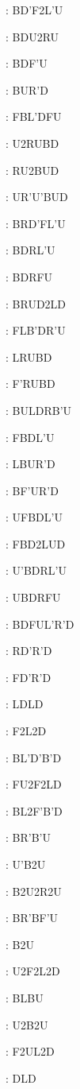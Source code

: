 \documentclass[9pt]{article}
\begin{document}
{\begin{multicols}{6}
: BD'F2L'U

: BDU2RU

: BDF'U

: BUR'D

: FBL'DFU

: U2RUBD

: RU2BUD

: UR'U'BUD

: BRD'FL'U

: BDRL'U

: BDRFU

: BRUD2LD

: FLB'DR'U

: LRUBD

: F'RUBD

: BULDRB'U

: FBDL'U

: LBUR'D

: BF'UR'D

: UFBDL'U

: FBD2LUD

: U'BDRL'U

: UBDRFU

: BDFUL'R'D

: RD'R'D

: FD'R'D

: LDLD

: F2L2D

: BL'D'B'D

: FU2F2LD

: BL2F'B'D

: BR'B'U

: U'B2U

: B2U2R2U

: BR'BF'U

: B2U

: U2F2L2D

: BLBU

: U2B2U

: F2UL2D

: DLD


\end{multicols}}
\end{document}
